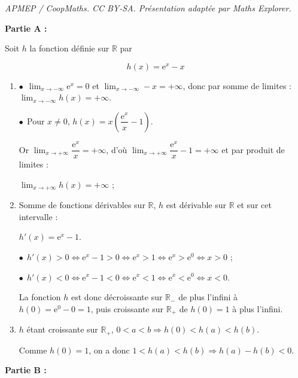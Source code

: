 \documentclass[10pt]{article}
\providecommand{\R}{\mathbb{R}}
\begin{document}
\noindent\textit{APMEP / CoopMaths. CC BY-SA. Présentation adaptée par Maths Explorer.}\par\medskip
\bigskip

\textbf{Partie A :}

\medskip

Soit $h$ la fonction définie sur $\R$ par

\[h(x) = \text{e}^x - x\]

\smallskip

\begin{enumerate}
\item 

$\bullet~~$$\displaystyle\lim_{x \to - \infty} \text{e}^x = 0$ et $\displaystyle\lim_{x \to - \infty} - x = + \infty$, donc par somme de limites : $\displaystyle\lim_{x \to - \infty} h(x) = + \infty$.

$\bullet~~$Pour $x \ne 0$, \: $h(x) = x\left(\dfrac{\text{e}^x}{x} - 1\right)$.

Or $\displaystyle\lim_{x \to + \infty} \dfrac{\text{e}^x}{x} = + \infty$, d'où $\displaystyle\lim_{x \to + \infty}\dfrac{\text{e}^x}{x} - 1 = + \infty$ et par produit de limites :

$\displaystyle\lim_{x \to + \infty} h(x) = + \infty$ ; 

\item 

Somme de fonctions dérivables sur $\R$, $h$ est dérivable sur $\R$ et sur cet intervalle :

$h'(x) =  \text{e}^x - 1$.

$\bullet~~$$h'(x) > 0 \iff \text{e}^x - 1 > 0 \iff \text{e}^x > 1 \iff \text{e}^x > \text{e}^0 \iff x > 0$ ;

$\bullet~~$$h'(x) < 0 \iff \text{e}^x - 1 < 0 \iff \text{e}^x < 1 \iff \text{e}^x < \text{e}^0 \iff x < 0$.

La fonction $h$ est donc décroissante sur $\R_{-}$ de plus l'infini à $h(0) = \text{e}^0 - 0 = 1$, puis croissante sur $\R_{+}$ de $h(0) = 1$ à plus l'infini.
\item 


$h$ étant croissante sur $\R_{+}$, \: $0 < a < b \Rightarrow h(0) < h(a) < h(b)$.

Comme $h(0) = 1$, on a donc $1 < h(a) < h(b) \Rightarrow h(a) - h(b) < 0$.
\end{enumerate}

\bigskip

\textbf{Partie B :}

\medskip
\end{document}
